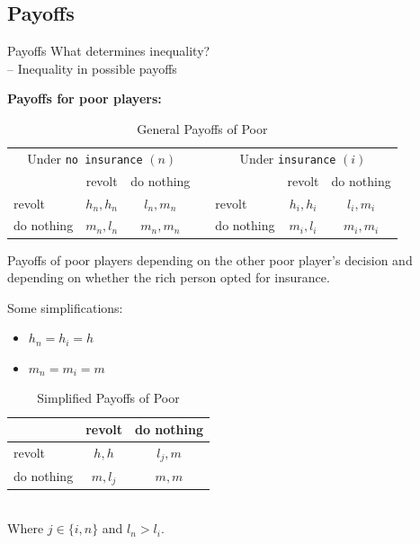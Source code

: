 \documentclass[mathserif]{beamer}
\begin{document}
	\subsection{Payoffs}
	\begin{frame}{Payoffs}
		What determines inequality?\\
		-- Inequality in possible payoffs
		
		\pause
		\textbf{Payoffs for poor players:}
		\begin{adjustwidth*}{-1cm}{-1cm}
		\begin{table}[!htbp]
			\caption{General Payoffs of Poor}
			\label{table:gpayoff}
			\begin{center}
				\begin{tabular}{|l|c|c|c|l|c|c|}
					\multicolumn{3}{c}{Under \texttt{no insurance} $(n)$} &
					\multicolumn{1}{c}{} &
					\multicolumn{3}{c}{Under \texttt{insurance} $(i)$}\\
					\cline{1-3}\cline{5-7}
					& revolt & do nothing & & & revolt & do nothing\\
					\cline{1-3}\cline{5-7}
					revolt & $h_n, h_n$ & $l_n, m_n$ && revolt & $h_i, h_i$ & $l_i, 
					m_i$\\
					\cline{1-3}\cline{5-7}
					do nothing & $m_n, l_n$ & $m_n, m_n$ && do nothing & $m_i, l_i$ & 
					$m_i, m_i$\\
					\cline{1-3}\cline{5-7}
				\end{tabular}
			\end{center}
					\footnotesize
					Payoffs of poor players depending on the other poor player's decision 
					and depending on whether the rich person opted for insurance. 
		\end{table}
		\end{adjustwidth*}
	\end{frame}
	
	\begin{frame}
		Some simplifications:
		
		\begin{itemize}
			\item $h_n=h_i=h$
			\item $m_n=m_i=m$
		\end{itemize}
		
		\pause
		\begin{table}[!htbp]
			\caption{Simplified Payoffs of Poor}
			\label{spayoff}
			\centering
			\begin{tabular}{|l|c|c|}
				\hline
				& revolt & do nothing\\
				\hline
				revolt & $h, h$ & $l_j, m$\\
				\hline
				do nothing & $m, l_j$ & $m, m$\\
				\hline
			\end{tabular}\\
			\footnotesize Where $j\in\{i, n\}$ and $l_n>l_i$.
		\end{table}
	\end{frame}
	
\end{document}
